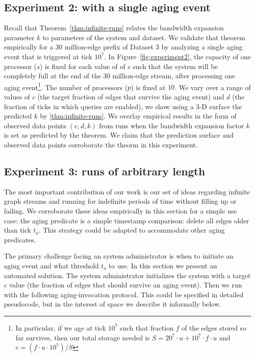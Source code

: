 \subsection{Experiment 2: \XSCC with a single aging event}
Recall that Theorem~\ref{thm:infinite-runs} relates the \XStream bandwidth
expansion parameter $k$ to parameters of the system and dataset.  We
validate that theorem empirically for a 30 million-edge prefix of Dataset 3
by analyzing a single aging event that is triggered at \XStream tick $10^7$.  In Figure~\ref{fig:experiment2}, the capacity of one
\XStream processor ($s$) is fixed for each value of of $c$ such that the system will be completely full at the end of the 30 million-edge stream, after processing one aging event\footnote{In particular, if we age at \XStream tick $10^7$ such that fraction $f$ of the edges stored so far survives, then our total storage needed is $S= 20^7\cdot u+10^7\cdot f\cdot u$ and $c = (f\cdot u\cdot 10^7)/S$ 
}.
The number of \XStream processors ($p$) is fixed at $10$. 
We vary over a range of values of $c$ (the target fraction of edges that 
survive the aging event) and $d$ (the
fraction of \XStream ticks in which queries are enabled), we show using
a 3-D surface the predicted $k$ by \ref{thm:infinite-runs}.  We overlay
empirical results in the form of observed data points $(c,d,k)$ 
from \XSCC runs when the bandwidth expansion factor $k$ is set as predicted
by the theorem.  We claim that the prediction surface and observed data 
points corroborate the theorm in this experiment.

\subsection{Experiment 3: \XSCC runs of arbitrary length}

The most important contribution of our work is our set of ideas regarding
infinite graph streams and running  \XSCC for indefinite periods of time
without filling up or failing.  We corroborate these ideas empirically
in this section for a simple use case: the aging predicate is a simple
timestamp comparison: delete all edges older than \XStream tick $t_a$.
This strategy could be adapted to accommodate other aging predicates.

The primary challenge facing an \XStream system administrator is when to
initiate an aging event and what threshold $t_a$ to use. In this section
we present an automated solution.  The system administrator initializes
the system with a target $c$ value (the fraction of edges that should
survive an aging event).  Then we run \XSCC with the following
aging-invocation protocol.  This could be specified in detailed pseudocode,
but in the interest of space we describe it informally below.

